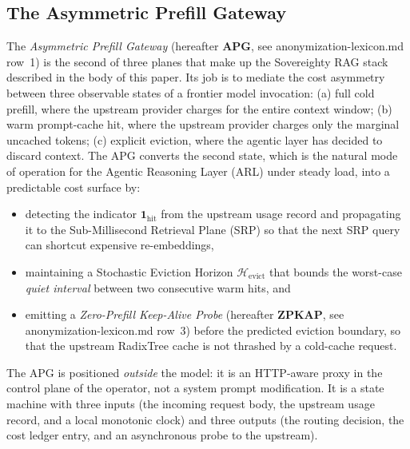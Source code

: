 
\subsection{The Asymmetric Prefill Gateway}
\label{app:apg}

The \emph{Asymmetric Prefill Gateway} (hereafter \textbf{APG}, see
anonymization-lexicon.md row~1) is the second of three planes that make up
the Sovereighty RAG stack described in the body of this paper. Its job is
to mediate the cost asymmetry between three observable states of a
frontier model invocation: (a) full cold prefill, where the upstream
provider charges for the entire context window; (b) warm prompt-cache hit,
where the upstream provider charges only the marginal uncached tokens;
(c) explicit eviction, where the agentic layer has decided to discard
context. The APG converts the second state, which is the natural mode of
operation for the Agentic Reasoning Layer (ARL) under steady load, into a
predictable cost surface by:

\begin{itemize}
  \item detecting the indicator $\mathbf{1}_{\text{hit}}$ from the upstream
        usage record and propagating it to the Sub-Millisecond Retrieval
        Plane (SRP) so that the next SRP query can shortcut expensive
        re-embeddings,
  \item maintaining a Stochastic Eviction Horizon
        $\mathcal{H}_{\text{evict}}$ that bounds the worst-case
        \emph{quiet interval} between two consecutive warm hits, and
  \item emitting a \emph{Zero-Prefill Keep-Alive Probe}
        (hereafter \textbf{ZPKAP}, see anonymization-lexicon.md row~3)
        before the predicted eviction boundary, so that the upstream
        RadixTree cache is not thrashed by a cold-cache request.
\end{itemize}

The APG is positioned \emph{outside} the model: it is an HTTP-aware
proxy in the control plane of the operator, not a system prompt
modification. It is a state machine with three inputs (the incoming
request body, the upstream usage record, and a local monotonic clock)
and three outputs (the routing decision, the cost ledger entry, and
an asynchronous probe to the upstream).


